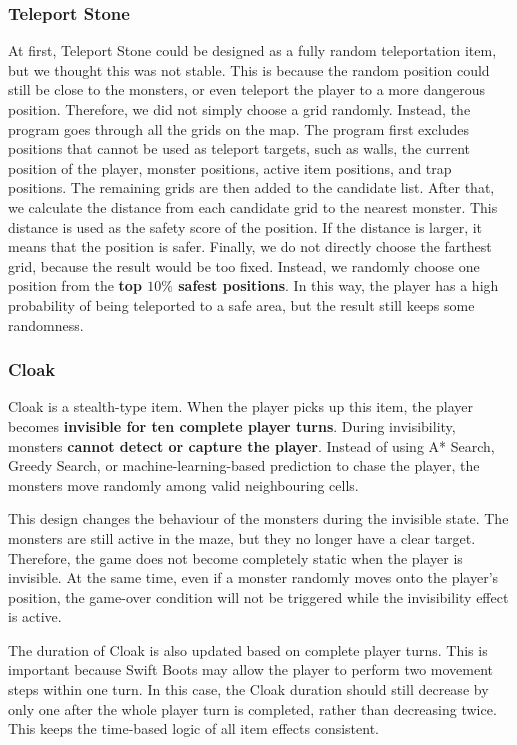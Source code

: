 \documentclass[12pt,a4paper]{article}
\begin{document}
\subsubsection{Teleport Stone}

At first, Teleport Stone could be designed as a fully random teleportation item, but we thought this was not stable. This is because the random position could still be close to the monsters, or even teleport the player to a more dangerous position. Therefore, we did not simply choose a grid randomly. Instead, the program goes through all the grids on the map.
The program first excludes positions that cannot be used as teleport targets, such as walls, the current position of the player, monster positions, active item positions, and trap positions. The remaining grids are then added to the candidate list. After that, we calculate the distance from each candidate grid to the nearest monster. This distance is used as the safety score of the position. If the distance is larger, it means that the position is safer.
Finally, we do not directly choose the farthest grid, because the result would be too fixed. Instead, we randomly choose one position from the \textbf{top $10\%$ safest positions}. In this way, the player has a high probability of being teleported to a safe area, but the result still keeps some randomness.

\subsubsection{Cloak}

Cloak is a stealth-type item. When the player picks up this item, the player becomes \textbf{invisible for ten complete player turns}. During invisibility, monsters \textbf{cannot detect or capture the player}. Instead of using A* Search, Greedy Search, or machine-learning-based prediction to chase the player, the monsters move randomly among valid neighbouring cells.

This design changes the behaviour of the monsters during the invisible state. The monsters are still active in the maze, but they no longer have a clear target. Therefore, the game does not become completely static when the player is invisible. At the same time, even if a monster randomly moves onto the player’s position, the game-over condition will not be triggered while the invisibility effect is active.

The duration of Cloak is also updated based on complete player turns. This is important because Swift Boots may allow the player to perform two movement steps within one turn. In this case, the Cloak duration should still decrease by only one after the whole player turn is completed, rather than decreasing twice. This keeps the time-based logic of all item effects consistent.
\end{document}
